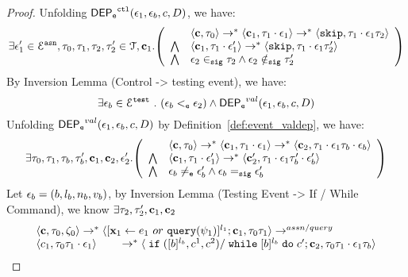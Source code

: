 \begin{proof}
Unfolding $\mathsf{DEP_{\mathtt{e}}}^{\mathtt{{ctl}}}(\mathtt{\epsilon}_1, \mathtt{\epsilon}_b, c, D)$, we have:
\[
\exists \event_1' \in \eventset^{\asn}, \vtrace_0,
\vtrace_1, \vtrace_2, \vtrace_2' \in \mathcal{T}, \ssa{c}_1.
  \left(
  \begin{array}{ll}   
  & \config{\ssa{c}, \vtrace_0} \rightarrow^{*} 
    \config{\ssa{c}_1, \vtrace_1 \cdot \event_1}  \rightarrow^{*} 
    \config{\eskip,  \vtrace_1 \cdot \event_1 \vtrace_2} 
  \\ 
  \bigwedge &
  \config{\ssa{c}_1, \vtrace_1 \cdot \event_1'}  \rightarrow^{*} 
  \config{\eskip,  \vtrace_1 \cdot \event_1 \vtrace_2' } 
  \\
  \bigwedge &
  \event_2 \sigin \vtrace_2 \land \event_2 \notsigin \vtrace_2'
\end{array}
\right)
 \]
 By Inversion Lemma (Control -> testing event), we have:
 \[
   \exists \mathtt{\epsilon}_b\in \mathcal{E}^{\mathtt{{test}}} ~.~ (\mathtt{\epsilon}_b <_{\mathtt{e}} \mathtt{\epsilon}_2) \land \mathsf{DEP_{\mathtt{e}}}^{val}(\mathtt{\epsilon}_1, \mathtt{\epsilon}_b, c, D)
 \]
 Unfolding $\mathsf{DEP_{\mathtt{e}}}^{val}(\mathtt{\epsilon}_1, \mathtt{\epsilon}_b, c, D)$ by Definition~\ref{def:event_valdep}, we have:
\[
\exists \vtrace_0,
\vtrace_1, \vtrace_b, \vtrace_b', \ssa{c}_1, \ssa{c}_2, \event_2'.
  \left(
  \begin{array}{ll}   
 & \config{\ssa{c}, \vtrace_0} \rightarrow^{*} 
\config{\ssa{c}_1, \vtrace_1 \cdot \event_1}  \rightarrow^{*} 
  \config{\ssa{c}_2,  \vtrace_1 \cdot \event_1 \vtrace_b \cdot \event_b } 
 \\ 
 \bigwedge &
  \config{\ssa{c}_1, \vtrace_1 \cdot \event_1'}  \rightarrow^{*} 
  \config{\ssa{c}_2',  \vtrace_1 \cdot \event_1 \vtrace_b' \cdot \event_b' } 
\\
\bigwedge &
\event_b \eventneq \event_b' \land \event_b \sigeq \event_b'
\end{array}
\right)
 \]
 Let $\mathtt{\epsilon}_b = (b, l_b, n_b, v_b)$, by Inversion Lemma (Testing Event -> If / While Command), we know $\exists \mathtt{\tau}_2, \mathtt{\tau}_2', {\boldsymbol{\mathbf{c}}}_1, {\boldsymbol{\mathbf{c}}}_2$
 \[
  \begin{array}{l}   
\langle {\boldsymbol{\mathbf{c}}}, \mathtt{\tau}_0, \mathtt{\zeta}_0 \rangle \rightarrow^{*} 
\langle [\mathrel{ {\boldsymbol{\mathbf{x}}}_1 \leftarrow e_1~ or ~ {\tt query}(\psi_1) }]^{l_1} ; {\boldsymbol{\mathbf{c}}}_1, \mathtt{\tau}_0 \mathtt{\tau}_1 \rangle  \rightarrow^{assn/query}
\\ 
 \langle c_1, \mathtt{\tau}_0 \mathtt{\tau}_1 \cdot \mathtt{\epsilon}_1 \rangle 
  \qquad \rightarrow^{*} 
  \langle \;\mathtt{if}\;([b]{}^{l_b}, c^1, c^2) / \;\mathtt{while}\; [b]{}^{l_b} \;\mathtt{do}\; c'; {\boldsymbol{\mathbf{c}}}_2, 
  \mathtt{\tau}_0 \mathtt{\tau}_1 \cdot \mathtt{\epsilon}_1 \mathtt{\tau}_b \rangle 
  \\

\end{array}\]
\end{proof}
